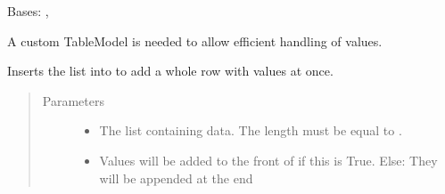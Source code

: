 \documentclass[letterpaper,10pt,english]{sphinxmanual}
\begin{document}
\begin{fulllineitems}
\label{\detokenize{src:src.PacketTableModel.PacketTableModel}}
Bases: , 

A custom TableModel is needed to allow efficient handling of  values.

\begin{fulllineitems}
\label{\detokenize{src:src.PacketTableModel.PacketTableModel.__init__}}
\end{fulllineitems}


\begin{fulllineitems}
\label{\detokenize{src:src.PacketTableModel.PacketTableModel.appendRow}}
Inserts the  list into  to add a whole row with values at once.
\begin{quote}\begin{description}
\item[{Parameters}] \leavevmode\begin{itemize}
\item {} 
 \textendash{} The list containing data. The length must be equal to {\hyperref[\detokenize{src:src.PacketTableModel.PacketTableModel.rowCount}]{}}.

\item {} 
 \textendash{} Values will be added to the front of  if this is True.
Else: They will be appended at the end


\end{itemize}
\end{description}
\end{quote}
\end{fulllineitems}
\end{fulllineitems}
\end{document}
